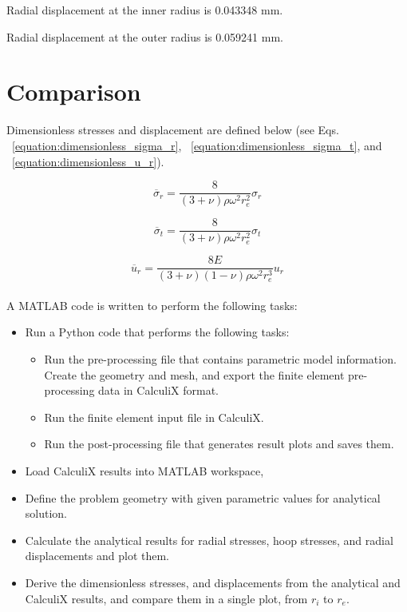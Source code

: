 \documentclass[12pt, a4paper, twoside]{article}
\begin{document}
Radial displacement at the inner radius is 0.043348 mm.

Radial displacement at the outer radius is 0.059241 mm.


\clearpage
\section{Comparison}
Dimensionless stresses and displacement are defined below (see Eqs. ~\ref{equation:dimensionless_sigma_r}, ~\ref{equation:dimensionless_sigma_t}, and ~\ref{equation:dimensionless_u_r}). 

\begin{equation}
\label{equation:dimensionless_sigma_r}
{ \overline{{\sigma }}_{r}=}{\frac {8} {(3+{\nu }){\rho }{{\omega }^{2}{r}^{2}_{e}}}}{\sigma }_{r}
\end{equation}

\begin{equation}
\label{equation:dimensionless_sigma_t}
{\overline{\sigma }_{t}=}{\frac {8} {(3+{\nu }){\rho }{{\omega }^{2}{r}^{2}_{e}}}}{\sigma }_{t} 
\end{equation}

\begin{equation}
\label{equation:dimensionless_u_r}
{\overline{u}_{r}=}{\frac {8E} {(3+{\nu })(1-{\nu }){\rho }{{\omega }^{2}{r}^{3}_{e}}}}{u}_{r}
\end{equation}\\

A MATLAB code is written to perform the following tasks:

\begin{itemize}
	\item Run a Python code that performs the following tasks:
	\begin{itemize}
		\item Run the pre-processing file that contains parametric model information. Create the geometry and mesh, and export the finite element pre-processing data in CalculiX format.
		\item Run the finite element input file in CalculiX.
		\item Run the post-processing file that generates result plots and saves them.
	\end{itemize}
	\item Load CalculiX results into MATLAB workspace,
	\item Define the problem geometry with given parametric values for analytical solution.
	\item Calculate the analytical results for radial stresses, hoop stresses, and radial displacements and plot them.
	\item Derive the dimensionless stresses, and displacements from the analytical and CalculiX results, and compare them in a single plot, from $r_i$ to $r_e$.
\end{itemize}
\end{document}
